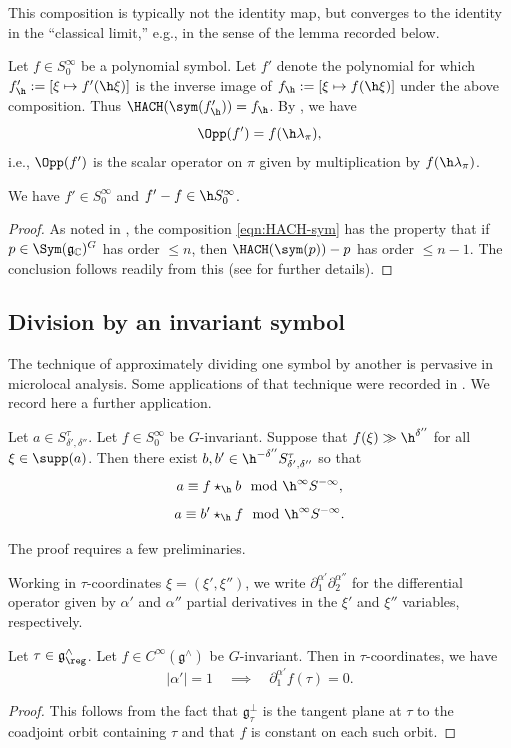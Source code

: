 This composition is typically not the identity map, but converges to the identity in the ``classical limit,'' e.g., in the sense of the lemma recorded below.

Let $f \in S^\infty_0$ be a polynomial symbol.  Let $f'$ denote the polynomial for which $f_{\h}' := [\xi \mapsto f'(\h \xi)]$ is the inverse image of $f_{\h} := [\xi \mapsto f(\h \xi)]$ under the above composition.  Thus $\HACH(\sym(f_{\h}')) = f_{\h}$.  By \cite[\S5.2]{nelson-venkatesh-1}, we have
\[
  \Opp(f') = f(\h \lambda_\pi),
\]
i.e., $\Opp(f')$ is the scalar operator on $\pi$ given by multiplication by $f(\h \lambda_\pi)$.
\begin{lemma}
  We have $f' \in S^\infty_0$ and $f ' - f \in  \h S^\infty_0$.
\end{lemma}
\begin{proof}
  As noted in \cite[\S9.9]{nelson-venkatesh-1}, the composition \eqref{eqn:HACH-sym} has the property that if $p \in \Sym(\mathfrak{g}_\mathbb{C})^G$ has order $\leq n$, then $\HACH(\sym(p)) - p$ has order $\leq n-1$.  The conclusion follows readily from this (see \cite[\S10.3]{nelson-venkatesh-1} for further details).
\end{proof}


\subsection{Division by an invariant symbol}
The technique of approximately dividing one symbol by another is pervasive in microlocal analysis.  Some applications of that technique were recorded in \cite[\S10]{nelson-venkatesh-1}.  We record here a further application.
\begin{proposition}\label{prop:divide-by-G-inv-symb}
  Let $a \in S_{\delta ', \delta ''}^{\tau}$.  Let $f \in S^\infty_0$ be $G$-invariant.  Suppose that $f(\xi) \gg \h^{\delta ''}$ for all $\xi \in \supp(a)$.  Then there exist $b, b' \in \h^{-\delta ''} S^\tau_{\delta', \delta ''}$ so that
  \[
    a \equiv f \star_{\h} b \mod{\h^\infty S^{-\infty}},
  \]
  \[
    a \equiv b' \star_{\h} f \mod{\h^\infty S^{-\infty}}.
  \]
\end{proposition}
The proof requires a few preliminaries.


Working in $\tau$-coordinates $\xi = (\xi ', \xi '')$, we write $\partial_1^{\alpha '} \partial_2^{\alpha ''}$ for the differential operator given by $\alpha '$ and $\alpha ''$ partial derivatives in the $\xi'$ and $\xi ''$ variables, respectively.
\begin{lemma}\label{lem:derivatives-along-orbits-inv-fn}
  Let $\tau \in \mathfrak{g}^\wedge_{\reg}$.  Let $f \in C^\infty(\mathfrak{g}^\wedge)$ be $G$-invariant.  Then in $\tau$-coordinates, we have
  \[
    |\alpha '| =1 \quad \implies \quad \partial_{1}^{\alpha '} f(\tau) = 0.
  \]
\end{lemma}
\begin{proof}
  This follows from the fact that $\mathfrak{g}_\tau^\perp$ is the tangent plane at $\tau$ to the coadjoint orbit containing $\tau$ and that $f$ is constant on each such orbit.
\end{proof}

